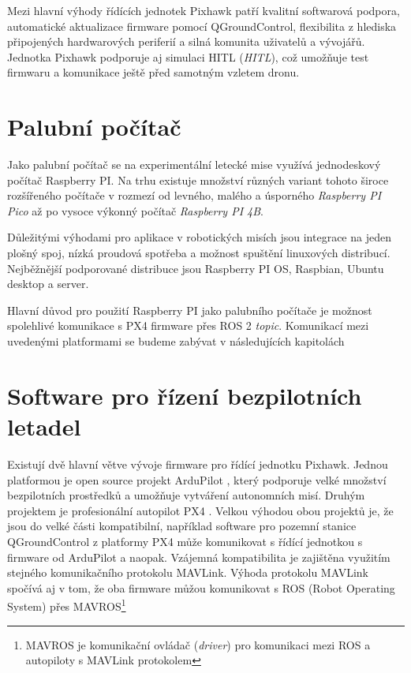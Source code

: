 Mezi hlavní výhody řídících jednotek Pixhawk patří kvalitní softwarová podpora, automatické aktualizace firmware pomocí QGroundControl, flexibilita z hlediska připojených hardwarových periferií a silná komunita uživatelů a vývojářů. Jednotka Pixhawk podporuje aj simulaci \acs{HITL} (\textit{\acl{HITL}}), což umožňuje test firmwaru a komunikace ještě před samotným vzletem dronu.

\section{Palubní počítač}

Jako palubní počítač se na experimentální letecké mise využívá jednodeskový počítač Raspberry PI. Na trhu existuje množství různých variant tohoto široce rozšířeného počítače v rozmezí od levného, malého a úsporného  \textit{Raspberry PI Pico} až po vysoce výkonný počítač \textit{Raspberry PI 4B}.

Důležitými výhodami pro aplikace v robotických misích jsou integrace na jeden plošný spoj, nízká proudová spotřeba a možnost spuštění linuxových distribucí. Nejběžnější podporované distribuce jsou Raspberry PI OS, Raspbian, Ubuntu desktop a server.

Hlavní důvod pro použití Raspberry PI jako palubního počítače je možnost spolehlivé komunikace s PX4 firmware přes ROS 2 \textit{topic}. Komunikací mezi uvedenými platformami se budeme zabývat v následujících kapitolách

\section{Software pro řízení bezpilotních letadel}

Existují dvě hlavní větve vývoje firmware pro řídící jednotku Pixhawk. Jednou platformou je open source projekt ArduPilot \cite{ARDU}, který podporuje velké množství bezpilotních prostředků a umožňuje vytváření autonomních misí. Druhým projektem je profesionální autopilot PX4 \cite{PX4ORG}. Velkou výhodou obou projektů je, že jsou do velké části kompatibilní, například software pro pozemní stanice QGroundControl z platformy PX4 může komunikovat s řídící jednotkou s firmware od ArduPilot a naopak. Vzájemná kompatibilita je zajištěna využitím stejného komunikačního protokolu MAVLink. Výhoda protokolu MAVLink spočívá aj v tom, že oba firmware můžou komunikovat s ROS (Robot Operating System) přes MAVROS\footnote{MAVROS je komunikační ovládač (\textit{driver}) pro komunikaci mezi ROS a autopiloty s MAVLink protokolem}


